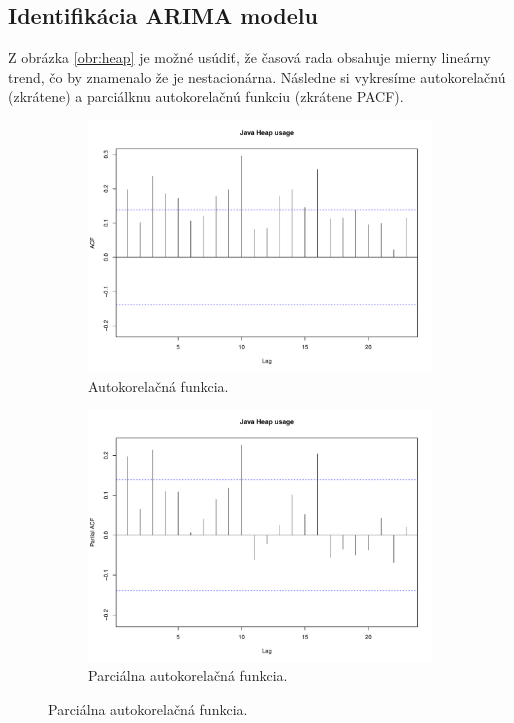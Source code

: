 \documentclass[12pt,a4paper,oneside,final]{article}
\theoremstyle{definition}
\theoremstyle{remark}
\numberwithin{equation}{section}
\begin{document}
\subsection{Identifikácia ARIMA modelu}
Z obrázka \ref{obr:heap} je možné usúdiť, že časová rada obsahuje mierny lineárny trend,
čo by znamenalo že je nestacionárna. Následne si vykresíme autokorelačnú (zkrátene) a
parciálknu autokorelačnú funkciu (zkrátene PACF).

\begin{figure}[!tbo] \centering
    \begin{subfigure}[b]{0.45\textwidth}
        \centering
        \includegraphics[width=1\linewidth]{images/heap_acf.pdf}
        \caption{Autokorelačná funkcia.}
        \label{obr:heap_acf}
    \end{subfigure}
    \begin{subfigure}[b]{0.45\textwidth}
        \centering
        \includegraphics[width=1\linewidth]{images/heap_pacf.pdf}
        \caption{Parciálna autokorelačná funkcia.}
        \label{obr:heap_pacf}
    \end{subfigure}
    \label{fig:test}
\end{figure}
\end{document}
